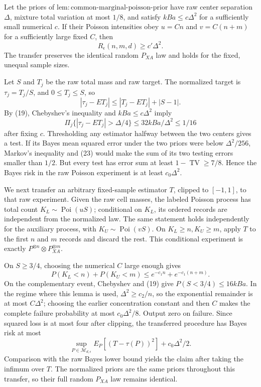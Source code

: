 Let the priors of \(\mathrm{lem:common\mbox{-}marginal\mbox{-}poisson\mbox{-}prior}\) have raw center separation \(\Delta\), mixture total variation at most \(1/8\), and satisfy \(kBa\le c\Delta^2\) for a sufficiently small numerical \(c\).  If their Poisson intensities obey \(u=Cn\) and \(v=C(n+m)\) for a sufficiently large fixed \(C\), then
\[
 R_\epsilon(n,m,d)\ge c'\Delta^2.
\]
The transfer preserves the identical random \(P_{XA}\) law and holds for the fixed, unequal sample sizes.

Let \(S\) and \(T_j\) be the raw total mass and raw target.  The normalized target is \(\tau_j=T_j/S\), and \(0\le T_j\le S\), so
\[
 |\tau_j-E T_j|\le |T_j-E T_j|+|S-1|. \tag{22}
\]
By (19), Chebyshev's inequality and \(kBa\le c\Delta^2\) imply
\[
 \Pi_j\{|\tau_j-E T_j|>\Delta/4\}\le32kBa/\Delta^2\le1/16 \tag{23}
\]
after fixing \(c\).  Thresholding any estimator halfway between the two centers gives a test.  If its Bayes mean squared error under the two priors were below \(\Delta^2/256\), Markov's inequality and (23) would make the sum of its two testing errors smaller than \(1/2\).  But every test has error sum at least \(1-\operatorname{TV}\ge7/8\).  Hence the Bayes risk in the raw Poisson experiment is at least \(c_0\Delta^2\).

We next transfer an arbitrary fixed-sample estimator \(T\), clipped to \([-1,1]\), to that raw experiment.  Given the raw cell masses, the labeled Poisson process has total count \(K_L\sim\operatorname{Poi}(uS)\); conditional on \(K_L\), its ordered records are independent from the normalized law.  The same statement holds independently for the auxiliary process, with \(K_U\sim\operatorname{Poi}(vS)\).  On \(K_L\ge n,K_U\ge m\), apply \(T\) to the first \(n\) and \(m\) records and discard the rest.  This conditional experiment is exactly \(P^{\otimes n}\otimes P_{XA}^{\otimes m}\).

On \(S\ge3/4\), choosing the numerical \(C\) large enough gives
\[
 P(K_L<n)+P(K_U<m)\le e^{-c_1n}+e^{-c_1(n+m)}.
\]
On the complementary event, Chebyshev and (19) give \(P(S<3/4)\le16kBa\).  In the regime where this lemma is used, \(\Delta^2\ge c_2/n\), so the exponential remainder is at most \(C\Delta^2\); choosing the earlier concentration constant and then \(C\) makes the complete failure probability at most \(c_0\Delta^2/8\).  Output zero on failure.  Since squared loss is at most four after clipping, the transferred procedure has Bayes risk at most
\[
 \sup_{P\in\mathcal M_{d,\epsilon}}E_P[(T-\tau(P))^2]+c_0\Delta^2/2.
\]
Comparison with the raw Bayes lower bound yields the claim after taking the infimum over \(T\).  The normalized priors are the same priors throughout this transfer, so their full random \(P_{XA}\) law remains identical.

